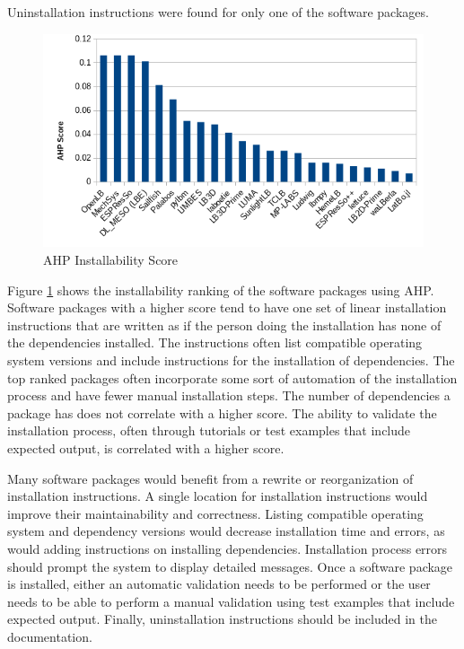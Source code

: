 \documentclass[12pt, notitlepage]{article}
\begin{document}
Uninstallation instructions were found for only one of the software packages.

\begin{figure}[h!]
	\begin{center}
		\includegraphics[width=1.0\textwidth]{installability_chart}
		\caption{AHP Installability Score}
		\label{Fig_Installability}
	\end{center}
\end{figure}

Figure \ref{Fig_Installability} shows the installability ranking of the software packages using AHP. Software packages with a higher score tend to have one set of linear installation instructions that are written as if the person doing the installation has none of the dependencies installed. The instructions often list compatible operating system versions and include instructions for the installation of dependencies. The top ranked packages often incorporate some sort of automation of the installation process and have fewer manual installation steps. The number of dependencies a package has does not correlate with a higher score. The ability to validate the installation process, often through tutorials or test examples that include expected output, is correlated with a higher score.

Many software packages would benefit from a rewrite or reorganization of installation instructions. A single location for installation instructions would improve their maintainability and correctness. Listing compatible operating system and dependency versions would decrease installation time and errors, as would adding instructions on installing dependencies. Installation process errors should prompt the system to display detailed messages. Once a software package is installed, either an automatic validation needs to be performed or the user needs to be able to perform a manual validation using test examples that include expected output. Finally, uninstallation instructions should be included in the documentation. 
 
\end{document}
